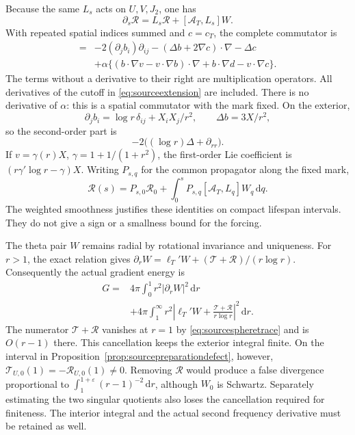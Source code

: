 \documentclass[11pt]{article}
\numberwithin{equation}{section}
\newcommand{\dd}{\,\mathrm d}
\begin{document}
Because the same $L_s$ acts on $U,V,J_2$, one has
\begin{equation}\label{eq:sourceresidualevolution}
 \partial_s\mathcal R=L_s\mathcal R+[\mathcal A_T,L_s]W.
\end{equation}
With repeated spatial indices summed and $c=c_T$, the complete
commutator is
\begin{align}
 [\mathcal A_T,L_s]={}&-2(\partial_jb_i)\partial_{ij}
  -(\Delta b+2\nabla c)\cdot\nabla-\Delta c\nonumber\\
 &+\alpha\big\{(b\cdot\nabla v-v\cdot\nabla b)\cdot\nabla
                 +b\cdot\nabla d-v\cdot\nabla c\big\}.
 \label{eq:sourcefullcommutator}
\end{align}
The terms without a derivative to their right are multiplication
operators. All derivatives of the cutoff in
\eqref{eq:sourceextension} are included. There is no derivative of
$\alpha$: this is a spatial commutator with the mark fixed.
On the exterior,
\[
 \partial_jb_i=\log r\,\delta_{ij}+X_iX_j/r^2,
 \qquad \Delta b=3X/r^2,
\]
so the second-order part is
\begin{equation}\label{eq:sourceprincipalcommutator}
 -2\big((\log r)\Delta+\partial_{rr}\big).
\end{equation}
If $v=\gamma(r)X$, $\gamma=1+1/(1+r^2)$, the first-order Lie
coefficient is $(r\gamma'\log r-\gamma)X$.
Writing $P_{s,q}$ for the common propagator along the fixed mark,
\begin{equation}\label{eq:sourceresidualduhamel}
 \mathcal R(s)=P_{s,0}\mathcal R_0+
       \int_0^sP_{s,q}[\mathcal A_T,L_q]W_q\dd q.
\end{equation}
The weighted smoothness justifies these identities on compact lifespan
intervals. They do not give a sign or a smallness bound for the forcing.

The theta pair $W$ remains radial by rotational invariance and
uniqueness. For $r>1$, the exact relation gives
$\partial_rW=\ell_T'W+(\mathcal T+\mathcal R)/(r\log r)$.
Consequently the actual gradient energy is
\begin{equation}\label{eq:sourcegradientrepresentation}
 \begin{split}
 G={}&4\pi\int_0^1r^2|\partial_rW|^2\dd r\\
 &+4\pi\int_1^\infty r^2
   \left|\ell_T'W+\frac{\mathcal T+\mathcal R}{r\log r}\right|^2\dd r.
 \end{split}
\end{equation}
The numerator $\mathcal T+\mathcal R$ vanishes at $r=1$ by
\eqref{eq:sourcespheretrace} and is $O(r-1)$ there. This cancellation
keeps the exterior integral finite. On the interval in
Proposition~\ref{prop:sourcepreparationdefect}, however,
$\mathcal T_{U,0}(1)=-\mathcal R_{U,0}(1)\ne0$.
Removing $\mathcal R$ would produce a false divergence proportional
to $\int_1^{1+\varepsilon}(r-1)^{-2}\dd r$, although $W_0$ is
Schwartz. Separately estimating the two singular quotients also loses
the cancellation required for finiteness. The interior integral and
the actual second frequency derivative must be retained as well.
\end{document}
